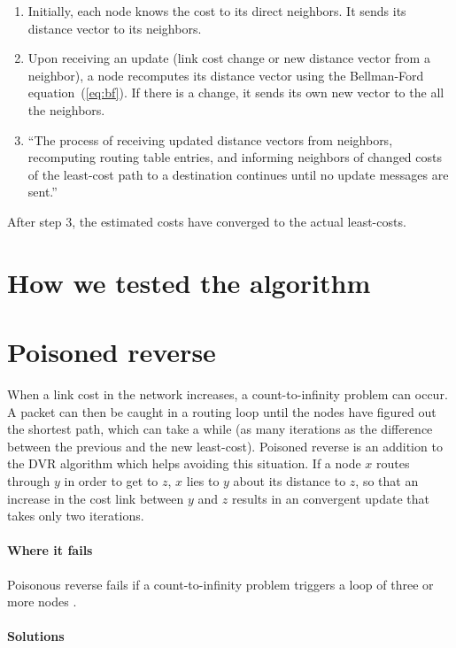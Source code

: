 \documentclass[12pt,a4paper]{article}
\begin{document}
\begin{enumerate}
\item Initially, each node knows the cost to its direct neighbors. It sends its distance vector to its neighbors.

\item Upon receiving an update (link cost change or new distance vector from a neighbor), a node recomputes its distance vector using the Bellman-Ford equation~(\ref{eq:bf}). If there is a change, it sends its own new vector to the all the neighbors.

\item ``The process of receiving updated distance vectors from neighbors, recomputing routing table entries, and informing neighbors of changed costs of the least-cost path to a destination continues until no update messages are sent.''~\cite[p.~375]{cn}
\end{enumerate}

After step 3, the estimated costs have converged to the actual least-costs.

\section{How we tested the algorithm}

\section{Poisoned reverse}
When a link cost in the network increases, a count-to-infinity problem can occur. A packet can then be caught in a routing loop until the nodes have figured out the shortest path, which can take a while (as many iterations as the difference between the previous and the new least-cost). Poisoned reverse is an addition to the DVR algorithm which helps avoiding this situation. If a node $x$ routes through $y$ in order to get to $z$, $x$ lies to $y$ about its distance to $z$, so that an increase in the cost link between $y$ and $z$ results in an convergent update that takes only two iterations. 

\paragraph{Where it fails}
Poisonous reverse fails if a count-to-infinity problem triggers a loop of three or more nodes \cite[p.~378]{cn}.

\paragraph{Solutions}



\nocite{*}
    
\end{document}
